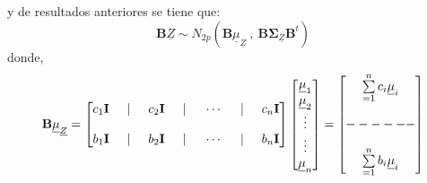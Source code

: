 \documentclass[
]{book}
\theoremstyle{definition}
\theoremstyle{definition}
\theoremstyle{definition}
\theoremstyle{definition}
\theoremstyle{remark}
\begin{document}
y de resultados anteriores se tiene que:
\[
\mathbf{B}\underline{Z} \sim N_{2p} \left( \mathbf{B} \underline{\mu}_{\underline{Z}} \ , \ \mathbf{B}\mathbf{\Sigma}_{\underline{Z}} \mathbf{B}^t \right)
\]
donde,
\[
\mathbf{B} \underline{\mu}_{\underline{Z}} = \begin{bmatrix}
 c_1\mathbf{I} \hspace{0.5cm}| \hspace{0.5cm} c_2\mathbf{I}  \hspace{0.5cm}| \hspace{0.5cm} \cdots  \hspace{0.5cm}| \hspace{0.5cm} c_n\mathbf{I} \\ \\ 
  b_1\mathbf{I} \hspace{0.5cm}| \hspace{0.5cm} b_2\mathbf{I}  \hspace{0.5cm}| \hspace{0.5cm} \cdots  \hspace{0.5cm}| \hspace{0.5cm} b_n\mathbf{I}
\end{bmatrix}\begin{bmatrix}
\underline{\mu}_1 \\ \underline{\mu}_2 \\ \vdots \\ \vdots \\ \underline{\mu}_n
\end{bmatrix}=  \begin{bmatrix}
\sum\limits_{=1}^n c_i \underline{\mathbf{\mu}}_i \\ \\ ------ \\ \\  \sum\limits_{=1}^n b_i \underline{\mathbf{\mu}}_i
\end{bmatrix} 
\]
\end{document}
